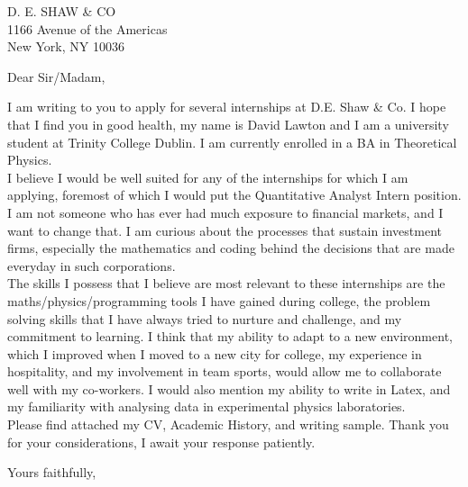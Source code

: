 \documentclass{letter}
\begin{document}
\begin{letter}{D. E. SHAW \& CO\\
1166 Avenue of the Americas\\
New York, NY 10036\\}
\opening{Dear Sir/Madam,}

I am writing to you to apply for several internships at D.E. Shaw \& Co. I hope that I find you in good health, my name is David Lawton and I am a university student at Trinity College Dublin. I am currently enrolled in a BA in Theoretical Physics.\\

I believe I would be well suited for any of the internships for which I am applying, foremost of which I would put the Quantitative Analyst Intern position. I am not someone who has ever had much exposure to financial markets, and I want to change that. I am curious about the processes that sustain investment firms, especially the mathematics and coding behind the decisions that are made everyday in such corporations.\\

The skills I possess that I believe are most relevant to these internships are the maths/physics/programming tools I have gained during college, the problem solving skills that I have always tried to nurture and challenge, and my commitment to learning. I think that my ability to adapt to a new environment, which I improved when I moved to a new city for college, my experience in hospitality, and my involvement in team sports, would allow me to collaborate well with my co-workers. I would also mention my ability to write in Latex, and my familiarity with analysing data in experimental physics laboratories.\\

Please find attached my CV, Academic History, and writing sample. Thank you for your considerations, I await your response patiently.\\


\closing{Yours faithfully,}
\end{letter}
\end{document}

